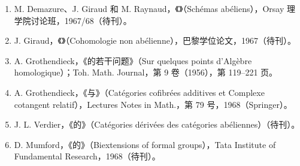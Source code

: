\begin{enumerate}
\renewcommand{\labelenumi}{[\arabic{enumi}]}
\item M. Demazure、J. Giraud 和 M. Raynaud，《》（Schémas abéliens），Orsay 理学院讨论班，1967/68（待刊）。
\item J. Giraud，《》（Cohomologie non abélienne），巴黎学位论文，1967（待刊）。
\item A. Grothendieck，《的若干问题》（Sur quelques points d'Algèbre homologique）；Toh. Math. Journal，第 9 卷（1956），第 119--221 页。
\item A. Grothendieck，《与》（Catégories cofibrées additives et Complexe cotangent relatif），Lectures Notes in Math.，第 79 号，1968（Springer）。
\item J. L. Verdier，《的》（Catégories dérivées des catégories abéliennes）（待刊）。
\item D. Mumford，《的》（Biextensions of formal groups），Tata Institute of Fundamental Research，1968（待刊）。
\end{enumerate}
